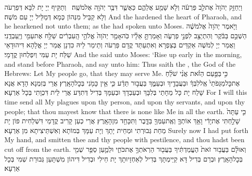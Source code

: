 {וַיְחַזֵּ֤ק יְהֹוָה֙ אֶת\maqqaf לֵ֣ב פַּרְעֹ֔ה וְלֹ֥א שָׁמַ֖ע אֲלֵהֶ֑ם כַּאֲשֶׁ֛ר דִּבֶּ֥ר יְהֹוָ֖ה אֶל\maqqaf מֹשֶֽׁה׃ \setuma }
{וְתַקֵּיף יְיָ יָת לִבָּא דְּפַרְעֹה וְלָא קַבֵּיל מִנְּהוֹן כְּמָא דְּמַלֵּיל יְיָ עִם מֹשֶׁה׃}
{And the \lord\space hardened the heart of Pharaoh, and he hearkened not unto them; as the \lord\space had spoken unto Moses.}{}
{וַיֹּ֤אמֶר יְהֹוָה֙ אֶל\maqqaf מֹשֶׁ֔ה הַשְׁכֵּ֣ם בַּבֹּ֔קֶר וְהִתְיַצֵּ֖ב לִפְנֵ֣י פַרְעֹ֑ה וְאָמַרְתָּ֣ אֵלָ֗יו כֹּֽה\maqqaf אָמַ֤ר יְהֹוָה֙ אֱלֹהֵ֣י הָֽעִבְרִ֔ים שַׁלַּ֥ח אֶת\maqqaf עַמִּ֖י וְיַֽעַבְדֻֽנִי׃}
{וַאֲמַר יְיָ לְמֹשֶׁה אַקְדֵּים בְּצַפְרָא וְאִתְעַתַּד קֳדָם פַּרְעֹה וְתֵימַר לֵיהּ כִּדְנָן אֲמַר יְיָ אֱלָהָא דִּיהוּדָאֵי שַׁלַּח יָת עַמִּי וְיִפְלְחוּן קֳדָמָי׃}
{And the \lord\space said unto Moses: ‘Rise up early in the morning, and stand before Pharaoh, and say unto him: Thus saith the \lord, the God of the Hebrews: Let My people go, that they may serve Me.}{}
{כִּ֣י \legarmeh  בַּפַּ֣עַם הַזֹּ֗את אֲנִ֨י שֹׁלֵ֜חַ אֶת\maqqaf כׇּל\maqqaf מַגֵּפֹתַי֙ אֶֽל\maqqaf לִבְּךָ֔ וּבַעֲבָדֶ֖יךָ וּבְעַמֶּ֑ךָ בַּעֲב֣וּר תֵּדַ֔ע כִּ֛י אֵ֥ין כָּמֹ֖נִי בְּכׇל\maqqaf הָאָֽרֶץ׃}
{אֲרֵי בְּזִמְנָא הָדָא אֲנָא שָׁלַח יָת כָּל מַחָתַי בְּלִבָּךְ וּבְעַבְדָךְ וּבְעַמָּךְ בְּדִיל דְּתִדַּע אֲרֵי לֵית דִּכְוָתִי בְּכָל אַרְעָא׃}
{For I will this time send all My plagues upon thy person, and upon thy servants, and upon thy people; that thou mayest know that there is none like Me in all the earth.}{}
{כִּ֤י עַתָּה֙ שָׁלַ֣חְתִּי אֶת\maqqaf יָדִ֔י וָאַ֥ךְ אוֹתְךָ֛ וְאֶֽת\maqqaf עַמְּךָ֖ בַּדָּ֑בֶר וַתִּכָּחֵ֖ד מִן\maqqaf הָאָֽרֶץ׃}
{אֲרֵי כְעַן קָרִיב קֳדָמַי דִּשְׁלַחִית פּוֹן יָת מַחַת גְּבוּרְתִי וּמְחֵית יָתָךְ וְיָת עַמָּךְ בְּמוֹתָא וְאִשְׁתֵּיצִיתָא מִן אַרְעָא׃}
{Surely now I had put forth My hand, and smitten thee and thy people with pestilence, and thou hadst been cut off from the earth.}{}
{וְאוּלָ֗ם בַּעֲב֥וּר זֹאת֙ הֶעֱמַדְתִּ֔יךָ בַּעֲב֖וּר הַרְאֹתְךָ֣ אֶת\maqqaf כֹּחִ֑י וּלְמַ֛עַן סַפֵּ֥ר שְׁמִ֖י בְּכׇל\maqqaf הָאָֽרֶץ׃}
{וּבְרַם בְּדִיל דָּא קַיֵּימְתָּךְ בְּדִיל לְאַחְזָיוּתָךְ יָת חֵילִי וּבְדִיל דִּיהוֹן מִשְׁתָּעַן גְּבוּרַת שְׁמִי בְּכָל אַרְעָא׃}
